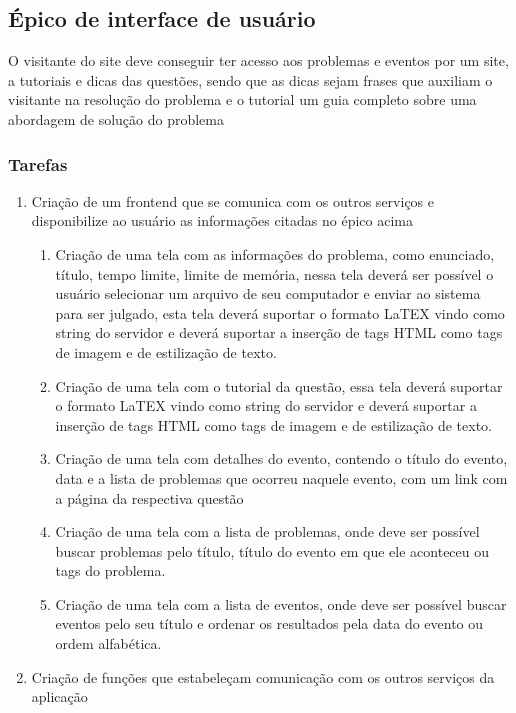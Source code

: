 \subsection{Épico de interface de usuário}

O visitante do site deve conseguir ter acesso aos problemas e eventos por um site, a tutoriais e dicas das questões, sendo que as dicas sejam frases que auxiliam o visitante na resolução do problema e o tutorial um guia completo sobre uma abordagem de solução do problema

\subsubsection{Tarefas}
\begin{enumerate}

    \item Criação de um frontend que se comunica com os outros serviços e disponibilize ao usuário as informações citadas no épico acima
          \begin{enumerate}
              \item Criação de uma tela com as informações do problema, como enunciado, título, tempo limite, limite de memória, nessa tela deverá ser possível o usuário selecionar um arquivo de seu computador e enviar ao sistema para ser julgado, esta tela deverá suportar o formato LaTEX vindo como string do servidor e deverá suportar a inserção de tags HTML como tags de imagem e de estilização de texto.
              \item Criação de uma tela com o tutorial da questão, essa tela deverá suportar o formato LaTEX vindo como string do servidor e deverá suportar a inserção de tags HTML como tags de imagem e de estilização de texto.
              \item Criação de uma tela com detalhes do evento, contendo o título do evento, data e a lista de problemas que ocorreu naquele evento, com um link com a página da respectiva questão
              \item Criação de uma tela com a lista de problemas, onde deve ser possível buscar problemas pelo título, título do evento em que ele aconteceu ou tags do problema.
              \item Criação de uma tela com a lista de eventos, onde deve ser possível buscar eventos pelo seu título e ordenar os resultados pela data do evento ou ordem alfabética.
          \end{enumerate}
    \item Criação de funções que estabeleçam comunicação com os outros serviços da aplicação

\end{enumerate}
